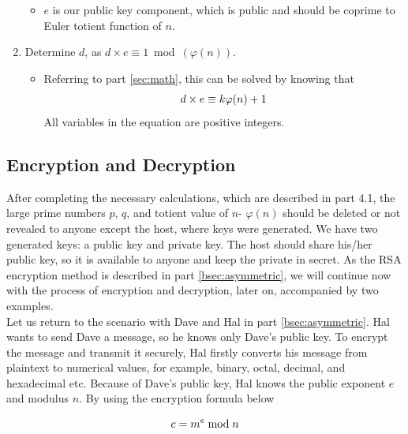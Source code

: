 \documentclass[a4paper, 12pt]{article}
\begin{document}
\begin{enumerate}
    \begin{itemize}
      \item $e$ is our public key component, which is public and should be coprime to Euler
totient function of $n$.
      \end{itemize}
  \item Determine $d$, as $d \times e \equiv 1 \bmod (\varphi(n))$.
    \begin{itemize}
    \item Referring to part \ref{sec:math}, this can be solved by knowing that
      \begin{equation*}
        d \times e \equiv k \varphi(n) + 1\\
        \end{equation*}
        All variables in the equation are positive integers.
      \end{itemize}
  \end{enumerate}

\subsection{Encryption and Decryption}
\label{bsec:ed}

After completing the necessary calculations, which are described in part 4.1, the large prime
numbers $p$, $q$, and totient value of $n$- $\varphi(n)$ should be deleted or not revealed to anyone except the
host, where keys were generated. We have two generated keys: a public key and private key. The
host should share his/her public key, so it is available to anyone and keep the private in secret. As
the RSA encryption method is described in part \ref{bsec:asymmetric}, we will continue now with the process of
encryption and decryption, later on, accompanied by two examples.\\

Let us return to the scenario with Dave and Hal in part \ref{bsec:asymmetric}. Hal wants to send Dave a message, so
he knows only Dave's public key. To encrypt the message and transmit it securely, Hal firstly
converts his message from plaintext to numerical values, for example, binary, octal, decimal, and
hexadecimal etc. Because of Dave's public key, Hal knows the public exponent $e$ and modulus $n$.
By using the encryption formula below

\begin{equation*}
  c = m^e \bmod n\\
  \end{equation*}
\end{document}

